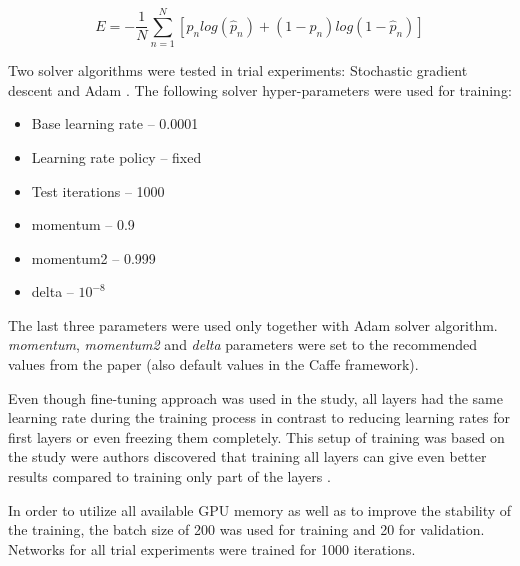     $$
    E = -\frac{1}{N} \sum_{n=1}^{N} [p_n log (\hat p_n) + (1 - p_n) log(1 - \hat p_n)]
    $$
    
    Two solver algorithms were tested in trial experiments: Stochastic gradient descent \cite{sgd} and Adam \cite{adam}. The following solver hyper-parameters were used for training:
    \begin{itemize}
        \item Base learning rate -- 0.0001
        \item Learning rate policy -- fixed
        \item Test iterations -- 1000
        \item momentum -- 0.9
        \item momentum2 -- 0.999
        \item delta -- $10^{-8}$
    \end{itemize}
    
    The last three parameters were used only together with Adam solver algorithm. \textit{momentum}, \textit{momentum2} and \textit{delta} parameters were set to the recommended values from the paper \cite{adam} (also default values in the Caffe framework).
    
    Even though fine-tuning approach was used in the study, all layers had the same learning rate during the training process in contrast to reducing learning rates for first layers or even freezing them completely. This setup of training was based on the study were authors discovered that training all layers can give even better results compared to training only part of the layers \cite{Yosinski2014HowTransferable}.
    
    In order to utilize all available GPU memory as well as to improve the stability of the training, the batch size of 200 was used for training and 20 for validation. Networks for all trial experiments were trained for 1000 iterations.
    
    
    
    
